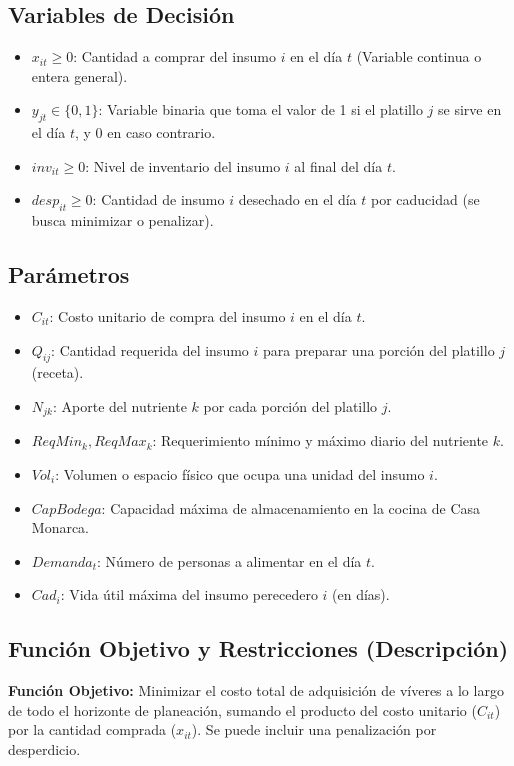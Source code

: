 \documentclass[12pt]{report}
\begin{document}
\subsection{Variables de Decisión}
\begin{itemize}
    \item $x_{it} \ge 0$: Cantidad a comprar del insumo $i$ en el día $t$ (Variable continua o entera general).
    \item $y_{jt} \in \{0,1\}$: Variable binaria que toma el valor de 1 si el platillo $j$ se sirve en el día $t$, y 0 en caso contrario.
    \item $inv_{it} \ge 0$: Nivel de inventario del insumo $i$ al final del día $t$.
    \item $desp_{it} \ge 0$: Cantidad de insumo $i$ desechado en el día $t$ por caducidad (se busca minimizar o penalizar).
\end{itemize}

\subsection{Parámetros}
\begin{itemize}
    \item $C_{it}$: Costo unitario de compra del insumo $i$ en el día $t$.
    \item $Q_{ij}$: Cantidad requerida del insumo $i$ para preparar una porción del platillo $j$ (receta).
    \item $N_{jk}$: Aporte del nutriente $k$ por cada porción del platillo $j$.
    \item $ReqMin_{k}, ReqMax_{k}$: Requerimiento mínimo y máximo diario del nutriente $k$.
    \item $Vol_{i}$: Volumen o espacio físico que ocupa una unidad del insumo $i$.
    \item $CapBodega$: Capacidad máxima de almacenamiento en la cocina de Casa Monarca.
    \item $Demanda_{t}$: Número de personas a alimentar en el día $t$.
    \item $Cad_{i}$: Vida útil máxima del insumo perecedero $i$ (en días).
\end{itemize}

\subsection{Función Objetivo y Restricciones (Descripción)}

\noindent \textbf{Función Objetivo:}
Minimizar el costo total de adquisición de víveres a lo largo de todo el horizonte de planeación, sumando el producto del costo unitario ($C_{it}$) por la cantidad comprada ($x_{it}$). Se puede incluir una penalización por desperdicio.
\end{document}
